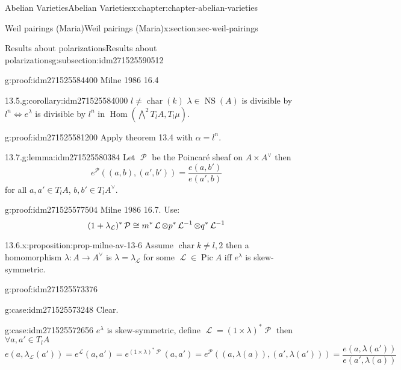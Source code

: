 \documentclass[oneside,10pt,]{book}
\newcommand{\qedhere}{\relax}
\numberwithin{equation}{section}
\newcommand{\sheaf}[1]{\operatorname{\mathcal{#1}}}
\DeclareMathOperator{\Hom}{Hom}
\DeclareMathOperator{\Pic}{Pic}
\DeclareMathOperator{\characteristic}{char}
\DeclareMathOperator{\NS}{NS}
\begin{document}
\begin{chapterptx}{Abelian Varieties}{}{Abelian Varieties}{}{}{x:chapter:chapter-abelian-varieties}
\begin{sectionptx}{Weil pairings (Maria)}{}{Weil pairings (Maria)}{}{}{x:section:sec-weil-pairings}
\begin{subsectionptx}{Results about polarizations}{}{Results about polarizations}{}{}{g:subsection:idm271525590512}
\begin{proofptx}{}{g:proof:idm271525584400}
Milne 1986 16.4%
\end{proofptx}
\begin{corollary}{13.5.}{}{g:corollary:idm271525584000}%
\(l \ne \characteristic (k)\) \(\lambda \in \NS(A) \) is divisible by \(l^n \iff e^\lambda\) is divisible by \(l^n\) in \(\Hom (\bigwedge^2 T_lA, T_l \mu)\).%
\end{corollary}
\begin{proofptx}{}{g:proof:idm271525581200}
Apply theorem 13.4 with \(\alpha = l^n\).%
\end{proofptx}
\begin{lemma}{13.7.}{}{g:lemma:idm271525580384}%
Let \(\sheaf P\) be the Poincaré sheaf on \(A\times A^\vee\) then%
\begin{equation*}
e^{\sheaf P} ((a,b),(a',b')) = \frac{e(a,b')}{e(a',b)}
\end{equation*}
for all \(a,a' \in T_l A\), \(b,b' \in T_l A^\vee\).%
\end{lemma}
\begin{proofptx}{}{g:proof:idm271525577504}
Milne 1986 16.7. Use:%
\begin{equation*}
(1+ \lambda_{\sheaf L})^* \sheaf P \cong m^* \sheaf L \otimes p^* \sheaf L^{-1} \otimes q^* \sheaf L^{-1}\qedhere
\end{equation*}
%
\end{proofptx}
\begin{proposition}{13.6.}{}{x:proposition:prop-milne-av-13-6}%
Assume \(\characteristic k \ne l,2\) then a homomorphism \(\lambda\colon A\to A^\vee\) is \(\lambda = \lambda_{\sheaf L}\) for some \(\sheaf L \in \Pic A\) iff \(e^\lambda\) is skew-symmetric.%
\end{proposition}
\begin{proofptx}{}{g:proof:idm271525573376}
\begin{case}{}{}{g:case:idm271525573248}
Clear.%
\end{case}
\begin{case}{}{}{g:case:idm271525572656}
\(e^\lambda\) is skew-symmetric, define \(\sheaf L = (1 \times \lambda)^* \sheaf P\) then  \(\forall a,a' \in T_l A\)%
\begin{equation*}
e(a,\lambda_{\sheaf L} (a') ) = e^{\sheaf L}(a,a') = e^{(1\times \lambda)^* \sheaf P} (a,a') = e^{\sheaf P}((a,\lambda (a)), (a',\lambda(a'))) = \frac{e(a,\lambda (a'))}{ e(a',\lambda(a))}
\end{equation*}
%
\begin{equation*}

\end{equation*}
\end{case}
\end{proofptx}
\end{subsectionptx}
\end{sectionptx}
\end{chapterptx}
\end{document}
